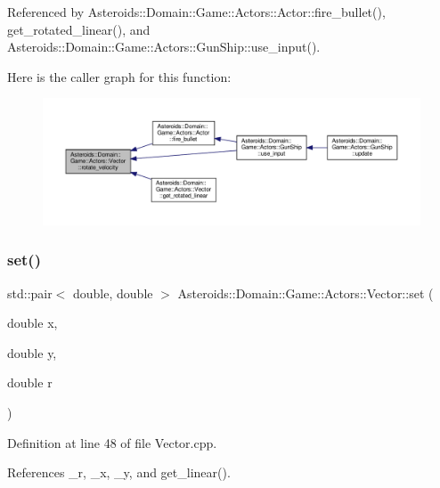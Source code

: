 Referenced by Asteroids\+::\+Domain\+::\+Game\+::\+Actors\+::\+Actor\+::fire\+\_\+bullet(), get\+\_\+rotated\+\_\+linear(), and Asteroids\+::\+Domain\+::\+Game\+::\+Actors\+::\+Gun\+Ship\+::use\+\_\+input().

Here is the caller graph for this function\+:\nopagebreak
\begin{figure}[H]
\begin{center}
\leavevmode
\includegraphics[width=350pt]{classAsteroids_1_1Domain_1_1Game_1_1Actors_1_1Vector_a540d3867c26c3cc6dafeb7a055cd392d_icgraph}
\end{center}
\end{figure}
\mbox{\label{classAsteroids_1_1Domain_1_1Game_1_1Actors_1_1Vector_a607de2905a1b5e79bc10c15cf4fb0416}} 
\subsubsection{\texorpdfstring{set()}{set()}}
{\footnotesize\ttfamily std\+::pair$<$ double, double $>$ Asteroids\+::\+Domain\+::\+Game\+::\+Actors\+::\+Vector\+::set (\begin{DoxyParamCaption}\item[{double}]{x,  }\item[{double}]{y,  }\item[{double}]{r }\end{DoxyParamCaption})}



Definition at line 48 of file Vector.\+cpp.



References \+\_\+r, \+\_\+x, \+\_\+y, and get\+\_\+linear().

